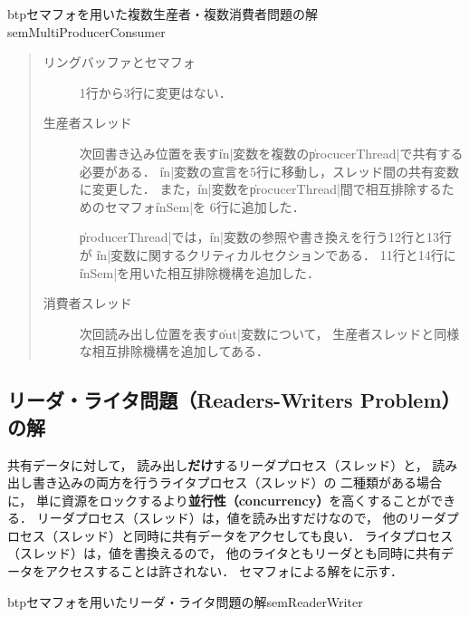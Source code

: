 \begin{myfig}{btp}{セマフォを用いた複数生産者・複数消費者問題の解}
{semMultiProducerConsumer}

\end{myfig}

\begin{quote}
\begin{description}
\item [リングバッファとセマフォ]
1行から3行に変更はない．

\item [生産者スレッド]
次回書き込み位置を表す\|in|変数を複数の\|procucerThread|で共有する必要がある．
\|in|変数の宣言を5行に移動し，スレッド間の共有変数に変更した．
また，\|in|変数を\|procucerThread|間で相互排除するためのセマフォ\|inSem|を
6行に追加した．

\|producerThread|では，\|in|変数の参照や書き換えを行う12行と13行が
\|in|変数に関するクリティカルセクションである．
11行と14行に\|inSem|を用いた相互排除機構を追加した．

\item [消費者スレッド]
次回読み出し位置を表す\|out|変数について，
生産者スレッドと同様な相互排除機構を追加してある．
\end{description}
\end{quote}

\subsection{リーダ・ライタ問題（Readers-Writers Problem）の解}
共有データに対して，
読み出し{\bf だけ}するリーダプロセス（スレッド）と，
読み出し書き込みの両方を行うライタプロセス（スレッド）の
二種類がある場合に，
単に資源をロックするより{\bf 並行性（concurrency）}を高くすることができる．
リーダプロセス（スレッド）は，値を読み出すだけなので，
他のリーダプロセス（スレッド）と同時に共有データをアクセしても良い．
ライタプロセス（スレッド）は，値を書換えるので，
他のライタともリーダとも同時に共有データをアクセスすることは許されない．
セマフォによる解をに示す．

\begin{myfig}{btp}{セマフォを用いたリーダ・ライタ問題の解}{semReaderWriter}

\end{myfig}

